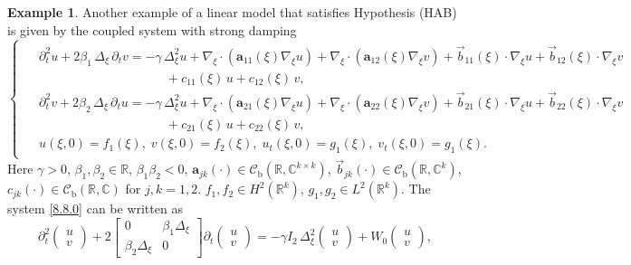 \documentclass[11pt]{amsart}
\numberwithin{equation}{section}
\newcommand\R{\mathbb R}
\newcommand\C{\mathbb C}
\newcommand{\RR}{{\mathbb R}}
\newcommand{\CC}{{\mathbb C}}
\newcommand{\rmb}{{\mathrm{b}}}
\theoremstyle{remark}
\theoremstyle{definition}
\newtheorem{example}[theorem]{Example}
\newcommand\cC{{\mathcal C}}
\begin{document}
\begin{example}\label{e8.8}
	Another example of a linear model that satisfies Hypothesis (HAB) is given by the coupled
	system with strong damping
	\begin{equation}\label{8.8.0}
		\begin{cases}
			\begin{aligned}&\partial_t^2 u + 2\beta_1\,\Delta_\xi\,\partial_t v
				= -\gamma\,\Delta_\xi^2 u + \nabla_\xi\cdot(\mathbf{a}_{11}(\xi)\nabla_\xi u)
				+ \nabla_\xi\cdot(\mathbf{a}_{12}(\xi)\nabla_\xi v)
				+ \vec{b}_{11}(\xi)\cdot\nabla_\xi u + \vec{b}_{12}(\xi)\cdot\nabla_\xi v\\
				&\qquad\qquad\qquad\qquad\qquad+ c_{11}(\xi)\,u + c_{12}(\xi)\,v,\\
				&\partial_t^2 v + 2\beta_2\,\Delta_\xi\,\partial_t u
				= -\gamma\,\Delta_\xi^2 u + \nabla_\xi\cdot(\mathbf{a}_{21}(\xi)\nabla_\xi u)
				+ \nabla_\xi\cdot(\mathbf{a}_{22}(\xi)\nabla_\xi v)
				+ \vec{b}_{21}(\xi)\cdot\nabla_\xi u + \vec{b}_{22}(\xi)\cdot\nabla_\xi v\\
				&\qquad\qquad\qquad\qquad\qquad+ c_{21}(\xi)\,u + c_{22}(\xi)\,v,\\
				&u(\xi,0) = f_1(\xi),\; v(\xi,0) = f_2(\xi),\;
				u_t(\xi,0) = g_1(\xi),\; v_t(\xi,0) = g_1(\xi).
			\end{aligned}
		\end{cases}
	\end{equation}
	Here $\gamma > 0$, $\beta_1,\beta_2\in\R$, $\beta_1\beta_2 < 0$,
	$\mathbf{a}_{jk}(\cdot) \in \cC_\rmb(\R,\C^{k\times k})$,
	$\vec{b}_{jk}(\cdot) \in \cC_\rmb(\R,\C^k)$, $c_{jk}(\cdot) \in \cC_\rmb(\RR,\CC)$
	for $j,k = 1,2$. $f_1, f_2 \in H^2(\R^k)$, $g_1, g_2 \in L^2(\R^k)$.
	The system \eqref{8.8.0} can be written as
	\begin{equation}\label{8.8.1}
		\partial_t^2\begin{pmatrix}u\\v\end{pmatrix}
		+ 2\begin{bmatrix}0 & \beta_1\Delta_\xi\\\beta_2\Delta_\xi & 0\end{bmatrix}
		\partial_t\begin{pmatrix}u\\v\end{pmatrix}
		= -\gamma I_2\,\Delta_\xi^2\begin{pmatrix}u\\v\end{pmatrix}
		+ W_0\begin{pmatrix}u\\v\end{pmatrix},

\end{equation}
\end{example}
\end{document}
